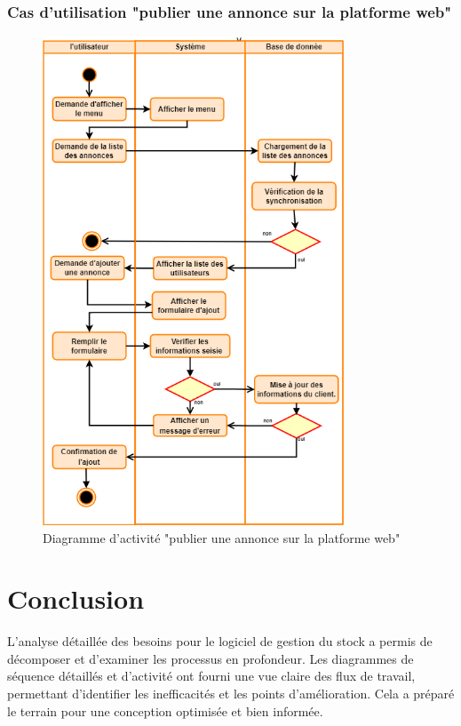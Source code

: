 \documentclass[edit,12pt,a4paper,ChapStyle,oneside,doubleinterligne]{report}
\begin{document}
\subsubsection{Cas d'utilisation "publier une annonce sur la platforme web"}
\begin{figure}[h!]\label{fig:activite publier}
    \centering
    \includegraphics[width=0.8\textwidth]{images/act Publier une annonce sur la platforme web.png}
    \caption{Diagramme d'activité "publier une annonce sur la platforme web"}
\end{figure}
\clearpage


\section{Conclusion}
L'analyse détaillée des besoins pour le logiciel de gestion du stock a permis de décomposer et d'examiner les processus en profondeur. Les diagrammes de séquence détaillés et d'activité ont fourni une vue claire des flux de travail, permettant d'identifier les inefficacités et les points d'amélioration. Cela a préparé le terrain pour une conception optimisée et bien informée.
\end{document}
